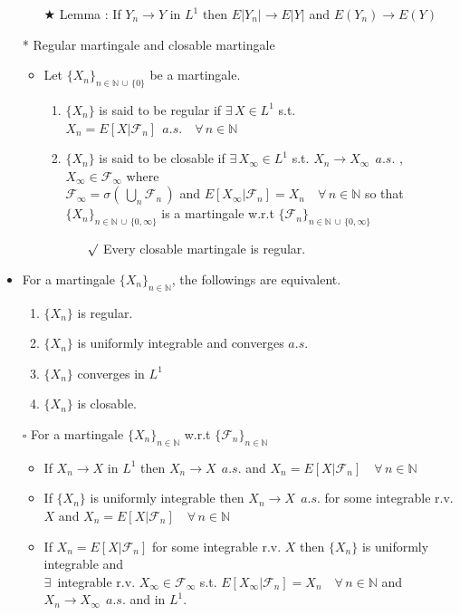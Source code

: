 \documentclass[12pt, A4]{article}
\newcommand{\sq}{$\square$}
\newcommand{\rmk}{$\surd$}
\newcommand{\trick}{$\bigstar$}
\newcommand{\N}{\mathbb{N}}
\newcommand{\F}{\mathcal{F}}
\newcommand{\union}{\,\cup\,}
\newcommand{\exist}{\exists\,}
\newcommand{\foranyn}{\quad \forall \, n\in \N}
\begin{document}
\begin{itemize}
	\begin{itemize}
		\item[\trick] Lemma : If $Y_n\rightarrow Y$ in $L^1$ then $E|Y_n|\rightarrow E|Y|$ and $E(Y_n)\rightarrow E(Y)$
	\end{itemize}
	\item[*] Regular martingale and closable martingale
	\begin{itemize}
		\item Let $\{X_n\}_{n\in \N\union \{0\}}$ be a martingale.
		\begin{enumerate}
			\item $\{X_n\}$ is said to be regular if $\exist X\in L^1$ s.t. $X_n=E[X|\F_n]\;\,a.s.\foranyn$
			\item $\{X_n\}$ is said to be closable if $\exist X_\infty\in L^1$ s.t. $X_n\rightarrow X_\infty\;\,a.s.$ , $X_\infty\in \F_\infty$ where \\$\F_\infty=\sigma(\,\bigcup_n \F_n\,)$ and  $E[X_\infty|\F_n]=X_n\foranyn$ so that \\ $\{X_n\}_{n\in \N\union \{0, \infty\}}$ is a martingale w.r.t $\{\F_n\}_{n\in \N\union \{0, \infty \}}$ 
			\begin{itemize}
				\item[\rmk] Every closable martingale is regular.
			\end{itemize}
		\end{enumerate}
	\end{itemize}
	\item For a martingale $\{X_n\}_{n\in \N}$, the followings are equivalent.
	\begin{enumerate}
		\item $\{X_n\}$ is regular.
		\item $\{X_n\}$ is uniformly integrable and converges $a.s.$
		\item $\{X_n\}$ converges in $L^1$
		\item $\{X_n\}$ is closable. 
	\end{enumerate}
	\item[\sq] For a martingale $\{X_n\}_{n\in \N}$ w.r.t $\{\F_n\}_{n\in \N}$
	\begin{itemize}
		\item If $X_n\rightarrow X$ in $L^1$ then $X_n\rightarrow X\;\, a.s.$ and $X_n=E[X|\F_n]\foranyn$
		\item If $\{X_n\}$ is uniformly integrable then $X_n\rightarrow X\;\, a.s.$ for some integrable r.v. $X$ and $X_n=E[X|\F_n]\foranyn$
		\item If $X_n=E[X|\F_n]$ for some integrable r.v. $X$ then $\{X_n\}$ is uniformly integrable and \\ $\exist$ integrable r.v. $X_\infty\in \F_\infty $ s.t. $E[X_\infty |\F_n]=X_n \foranyn$ and $X_n\rightarrow X_\infty\;\, a.s.$ and in $L^1$.

\end{itemize}
\end{itemize}
\end{document}
